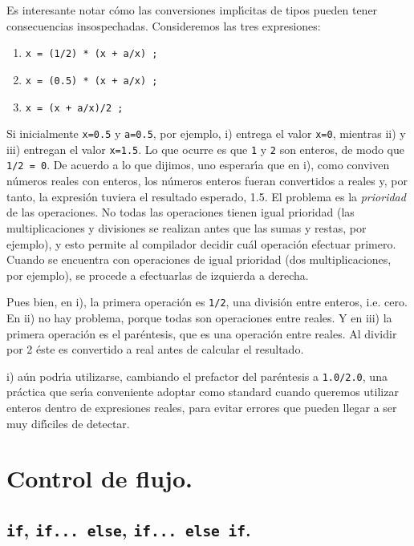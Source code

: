 \begin{enumerate}
Es interesante notar c{\'o}mo las conversiones impl{\'\i}citas de tipos pueden
tener consecuencias insospechadas. Consideremos las tres expresiones:
\begin{enumerate}
\item[i)] \verb-x = (1/2) * (x + a/x) ;-
\item[ii)] \verb-x = (0.5) * (x + a/x) ;-
\item[iii)] \verb-x = (x + a/x)/2 ;-
\end{enumerate}
Si inicialmente \verb+x=0.5+ y \verb+a=0.5+, por ejemplo, i) entrega el
valor \verb+x=0+, mientras  ii) y iii) entregan el valor
\verb+x=1.5+. Lo que ocurre es que \verb+1+ y \verb+2+ son enteros,
de modo que \verb+1/2 = 0+. De acuerdo a lo que dijimos, uno
esperar{\'\i}a que en i), como conviven n{\'u}meros reales con enteros,
los n{\'u}meros enteros fueran convertidos a reales y, por tanto, la
expresi{\'o}n tuviera el resultado esperado, 1.5. El problema es  la
{\em prioridad\/} de las operaciones. No todas las operaciones tienen
igual prioridad (las multiplicaciones y divisiones se realizan antes
que las sumas y restas, por ejemplo), y esto permite al compilador
decidir cu{\'a}l operaci{\'o}n efectuar primero. Cuando se encuentra con
operaciones de igual prioridad (dos multiplicaciones, por ejemplo),
se procede a efectuarlas de izquierda a derecha.

Pues bien, en i), la primera operaci{\'o}n es \verb+1/2+, una
divisi{\'o}n entre enteros, i.e. cero. En ii) no hay problema, porque
todas son operaciones entre reales. Y en iii) la primera operaci{\'o}n
es el par{\'e}ntesis, que es una operaci{\'o}n entre reales. Al dividir
por 2 {\'e}ste es convertido a real antes de calcular el resultado. 

i) a{\'u}n podr{\'\i}a utilizarse, cambiando el prefactor del
par{\'e}ntesis a \verb+1.0/2.0+, una pr{\'a}ctica que ser{\'\i}a
conveniente adoptar como standard cuando queremos utilizar enteros
dentro de expresiones reales, para evitar errores que pueden
llegar a ser muy dif{\'\i}ciles de detectar. 
\end{enumerate}


\section{Control de flujo.}

\subsection{{\tt if}, {\tt if... else}, {\tt if... else if}.}

